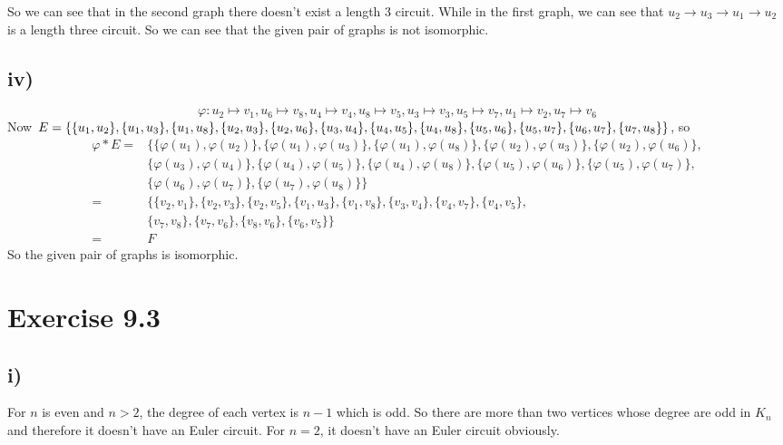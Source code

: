 \documentclass[a4paper,12pt,titlepage]{article}
\begin{document}
So we can see that in the second graph there doesn't exist a length 3 circuit. While in the first graph, we can see that $u_2\rightarrow u_3\rightarrow u_1\rightarrow u_2$ is a length three circuit. So we can see that the given pair of graphs is  not isomorphic.


\subsection*{iv)}
$$\varphi:u_2\mapsto v_1,u_6\mapsto v_8,u_4\mapsto v_4,u_8\mapsto v_5,u_3\mapsto v_3,u_5\mapsto v_7,u_1\mapsto v_2,u_7\mapsto v_6$$
Now $E=\lbrace \lbrace u_1,u_2\rbrace,\lbrace u_1,u_3\rbrace,\lbrace u_1,u_8\rbrace,\lbrace u_2,u_3\rbrace,\lbrace u_2,u_6\rbrace,\lbrace u_3,u_4\rbrace,\lbrace u_4,u_5\rbrace,\lbrace u_4,u_8\rbrace,\\\lbrace u_5,u_6\rbrace,\lbrace u_5,u_7\rbrace,\lbrace u_6,u_7\rbrace,\lbrace u_7,u_8\rbrace\rbrace$, so
\begin{align*}
\varphi* E=&\lbrace \lbrace \varphi(u_1),\varphi(u_2)\rbrace, \lbrace \varphi(u_1),\varphi(u_3)\rbrace, \lbrace \varphi(u_1),\varphi(u_8)\rbrace, \lbrace \varphi(u_2),\varphi(u_3)\rbrace,\lbrace \varphi(u_2),\varphi(u_6)\rbrace,\\&\lbrace \varphi(u_3),\varphi(u_4)\rbrace,\lbrace \varphi(u_4),\varphi(u_5)\rbrace,\lbrace \varphi(u_4),\varphi(u_8)\rbrace,\lbrace \varphi(u_5),\varphi(u_6)\rbrace,\lbrace \varphi(u_5),\varphi(u_7)\rbrace,\\
&\lbrace \varphi(u_6),\varphi(u_7)\rbrace,\lbrace \varphi(u_7),\varphi(u_8)\rbrace\rbrace\\
=&\lbrace \lbrace v_2,v_1\rbrace,\lbrace v_2,v_3\rbrace,\lbrace v_2,v_5\rbrace,\lbrace v_1,u_3\rbrace,\lbrace v_1,v_8\rbrace,\lbrace v_3,v_4\rbrace,\lbrace v_4,v_7\rbrace,\lbrace v_4,v_5\rbrace,\\
&\lbrace v_7,v_8\rbrace,\lbrace v_7,v_6\rbrace,\lbrace v_8,v_6\rbrace,\lbrace v_6,v_5\rbrace\rbrace\\
=&F
\end{align*}
So the given pair of graphs is isomorphic.
\section*{Exercise 9.3}
\subsection*{i)}
For $n$ is even and $n>2$, the degree of each vertex is $n-1$ which is odd. So there are more than two vertices whose degree are odd in $K_n$ and therefore it doesn't have an Euler circuit. For $n=2$, it doesn't have an Euler circuit obviously.
\end{document}
